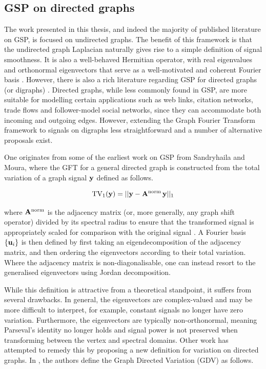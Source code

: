\subsection{GSP on directed graphs}

The work presented in this thesis, and indeed the majority of published literature on GSP, is focused on undirected graphs. The benefit of this framework is that the undirected graph Laplacian naturally gives rise to a simple definition of signal smoothness. It is also a well-behaved Hermitian operator, with real eigenvalues and orthonormal eigenvectors that serve as a well-motivated and coherent Fourier basis \citep{Ortega2018}. However, there is also a rich literature regarding GSP for directed graphs (or digraphs) \citep{Marques2020}. Directed graphs, while less commonly found in GSP, are more suitable for modelling certain applications such as web links, citation networks, trade flows and follower-model social networks, since they can accommodate both incoming and outgoing edges. However, extending the Graph Fourier Transform framework to signals on digraphs less straightforward and a number of alternative proposals exist. 

One originates from some of the earliest work on GSP from Sandryhaila and Moura, where the GFT for a general directed graph is constructed from the total variation of a graph signal $\mathbf{y}$ defined as follows. 

\begin{equation}
    \text{TV}_1(\mathbf{y}) = || \mathbf{y} - \mathbf{A}^{\text{norm}} \, \mathbf{y} ||_1
\end{equation}

where $\mathbf{A}^{\text{norm}}$ is the adjacency matrix (or, more generally, any graph shift operator) divided by its spectral radius to ensure that the transformed signal is appropriately scaled for comparison with the original signal \citep{Sandryhaila2013b}. A Fourier basis $\{\mathbf{u}_i \}$ is then defined by first taking an eigendecomposition of the adjacency matrix, and then ordering the eigenvectors according to their total variation. Where the adjacency matrix is non-diagonalisable, one can instead resort to the generalised eigenvectors using Jordan decomposition. 

While this definition is attractive from a theoretical standpoint, it suffers from several drawbacks. In general, the eigenvectors are complex-valued and may be more difficult to interpret, for example, constant signals no longer have zero variation. Furthermore, the eigenvectors are typically non-orthonormal, meaning Parseval's identity no longer holds and  signal power is not preserved when transforming between the vertex and spectral domains. Other work has attempted to remedy this by proposing a new definition for variation on directed graphs. In \cite{Sardellitti2017}, the authors define the Graph Directed Variation (GDV) as follows. 

